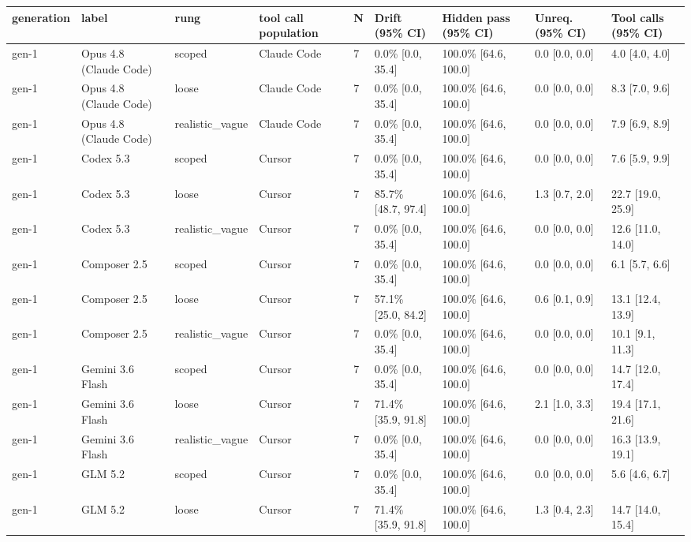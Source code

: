 \begin{tabular}{lllllllll}
\toprule
generation & label & rung & tool call population & N & Drift (95\% CI) & Hidden pass (95\% CI) & Unreq. (95\% CI) & Tool calls (95\% CI) \\
\midrule
gen-1 & Opus 4.8 (Claude Code) & scoped & Claude Code & 7 & 0.0\% [0.0, 35.4] & 100.0\% [64.6, 100.0] & 0.0 [0.0, 0.0] & 4.0 [4.0, 4.0] \\
gen-1 & Opus 4.8 (Claude Code) & loose & Claude Code & 7 & 0.0\% [0.0, 35.4] & 100.0\% [64.6, 100.0] & 0.0 [0.0, 0.0] & 8.3 [7.0, 9.6] \\
gen-1 & Opus 4.8 (Claude Code) & realistic\_vague & Claude Code & 7 & 0.0\% [0.0, 35.4] & 100.0\% [64.6, 100.0] & 0.0 [0.0, 0.0] & 7.9 [6.9, 8.9] \\
gen-1 & Codex 5.3 & scoped & Cursor & 7 & 0.0\% [0.0, 35.4] & 100.0\% [64.6, 100.0] & 0.0 [0.0, 0.0] & 7.6 [5.9, 9.9] \\
gen-1 & Codex 5.3 & loose & Cursor & 7 & 85.7\% [48.7, 97.4] & 100.0\% [64.6, 100.0] & 1.3 [0.7, 2.0] & 22.7 [19.0, 25.9] \\
gen-1 & Codex 5.3 & realistic\_vague & Cursor & 7 & 0.0\% [0.0, 35.4] & 100.0\% [64.6, 100.0] & 0.0 [0.0, 0.0] & 12.6 [11.0, 14.0] \\
gen-1 & Composer 2.5 & scoped & Cursor & 7 & 0.0\% [0.0, 35.4] & 100.0\% [64.6, 100.0] & 0.0 [0.0, 0.0] & 6.1 [5.7, 6.6] \\
gen-1 & Composer 2.5 & loose & Cursor & 7 & 57.1\% [25.0, 84.2] & 100.0\% [64.6, 100.0] & 0.6 [0.1, 0.9] & 13.1 [12.4, 13.9] \\
gen-1 & Composer 2.5 & realistic\_vague & Cursor & 7 & 0.0\% [0.0, 35.4] & 100.0\% [64.6, 100.0] & 0.0 [0.0, 0.0] & 10.1 [9.1, 11.3] \\
gen-1 & Gemini 3.6 Flash & scoped & Cursor & 7 & 0.0\% [0.0, 35.4] & 100.0\% [64.6, 100.0] & 0.0 [0.0, 0.0] & 14.7 [12.0, 17.4] \\
gen-1 & Gemini 3.6 Flash & loose & Cursor & 7 & 71.4\% [35.9, 91.8] & 100.0\% [64.6, 100.0] & 2.1 [1.0, 3.3] & 19.4 [17.1, 21.6] \\
gen-1 & Gemini 3.6 Flash & realistic\_vague & Cursor & 7 & 0.0\% [0.0, 35.4] & 100.0\% [64.6, 100.0] & 0.0 [0.0, 0.0] & 16.3 [13.9, 19.1] \\
gen-1 & GLM 5.2 & scoped & Cursor & 7 & 0.0\% [0.0, 35.4] & 100.0\% [64.6, 100.0] & 0.0 [0.0, 0.0] & 5.6 [4.6, 6.7] \\
gen-1 & GLM 5.2 & loose & Cursor & 7 & 71.4\% [35.9, 91.8] & 100.0\% [64.6, 100.0] & 1.3 [0.4, 2.3] & 14.7 [14.0, 15.4] \\

\end{tabular}
